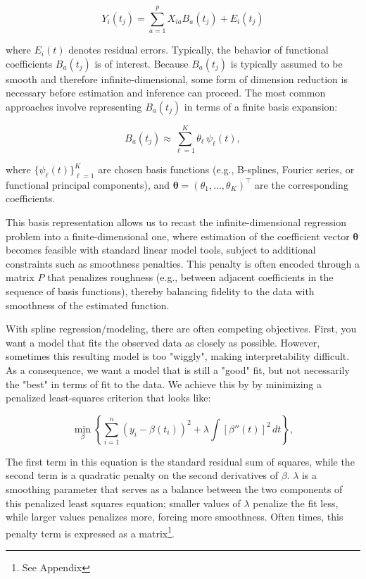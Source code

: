 \begin{equation}
    Y_i(t_j) = \sum_{a=1}^{p} X_{ia}B_a(t_j) + E_i(t_j)
\end{equation}

\noindent
where \(E_i(t)\) denotes residual errors.  
Typically, the behavior of functional coefficients \(B_a(t_j)\) is of interest.  
Because \(B_a(t_j)\) is typically assumed to be smooth and therefore infinite-dimensional, some form of dimension reduction is necessary before estimation and inference can proceed. 
The most common approaches involve representing \(B_a(t_j)\)  in terms of a finite basis expansion:

\begin{equation}
    B_a(t_j) \approx \sum_{\ell=1}^K \theta_\ell \, \psi_\ell(t),
\end{equation}

\noindent
where $\{\psi_\ell(t)\}_{\ell=1}^K$ are chosen basis functions (e.g., B-splines, Fourier series, or functional principal components), and $\boldsymbol\theta=(\theta_1,\ldots,\theta_K)^\top$ are the corresponding coefficients.  

This basis representation allows us to recast the infinite-dimensional regression problem into a finite-dimensional one, where estimation of the coefficient vector $\boldsymbol\theta$ becomes feasible with standard linear model tools, subject to additional constraints such as smoothness penalties. 
This penalty is often encoded through a matrix $P$ that penalizes roughness (e.g., between adjacent coefficients in the sequence of basis functions), thereby balancing fidelity to the data with smoothness of the estimated function.

With spline regression/modeling, there are often competing objectives.  
First, you want a model that fits the observed data as closely as possible.  
However, sometimes this resulting model is too "wiggly", making interpretability difficult.  
As a consequence, we want a model that is still a "good" fit, but not necessarily the "best" in terms of fit to the data.  
We achieve this by by minimizing a penalized least-squares criterion that looks like:

\begin{equation}
    \min_{\beta} \left\{ 
        \sum_{i=1}^{n} \left( y_i - \beta(t_i) \right)^2 
        + \lambda \int \left[\beta''(t)\right]^2 \, dt
        \right\},
\end{equation}

The first term in this equation is the standard residual sum of squares, while the second term is a quadratic penalty on the second derivatives of \(\beta\).  
\(\lambda\) is a smoothing parameter that serves as a balance between the two components of this penalized least squares equation; smaller values of \(\lambda\) penalize the fit less, while larger values penalizes more, forcing more smoothness.  
Often times, this penalty term is expressed as a matrix\footnote{See Appendix}.

